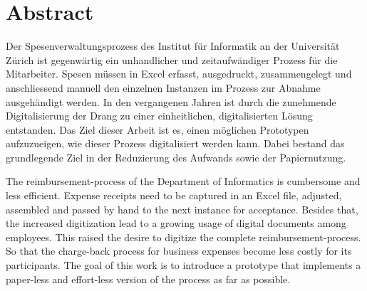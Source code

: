 \chapter*{Abstract}


Der Spesenverwaltungsprozess des Institut für Informatik an der Universität Zürich ist gegenwärtig ein unhandlicher und zeitaufwändiger Prozess für die Mitarbeiter. Spesen müssen in Excel erfasst, ausgedruckt, zusammengelegt und anschliessend manuell den einzelnen Instanzen im Prozess zur Abnahme ausgehändigt werden. In den vergangenen Jahren ist durch die zunehmende Digitalisierung der Drang zu einer einheitlichen, digitalisierten Lösung entstanden. Das Ziel dieser Arbeit ist es, einen möglichen Prototypen aufzuzueigen, wie dieser Prozess digitalisiert werden kann. Dabei bestand das grundlegende Ziel in der Reduzierung des Aufwands sowie der Papiernutzung.


The reimbursement-process of the Department of Informatics is cumbersome and less efficient. Expense receipts need to be captured in an Excel file, adjusted, assembled and passed by hand to the next instance for acceptance. Besides that, the increased digitization lead to a growing usage of digital documents among employees. This raised the desire to digitize the complete reimbursement-process. So that the charge-back process for business expenses become less costly for its participants. The goal of this work is to introduce a prototype that implements a paper-less and effort-less version of the process as far as possible.
